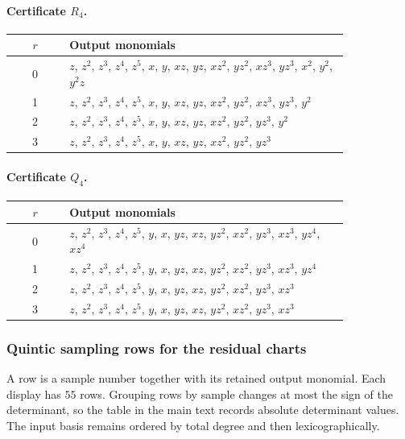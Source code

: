 \documentclass[11pt]{amsart}
\theoremstyle{definition}
\theoremstyle{remark}
\numberwithin{equation}{section}
\begin{document}
\paragraph{Certificate $R_{4}$.}\mbox{}
\begin{center}
\begin{tabular}{cp{0.83\linewidth}}
$r$ & Output monomials\\\hline
0 & \(z\), \(z^{2}\), \(z^{3}\), \(z^{4}\), \(z^{5}\), \(x\), \(y\), \(xz\), \(yz\), \(xz^{2}\), \(yz^{2}\), \(xz^{3}\), \(yz^{3}\), \(x^{2}\), \(y^{2}\), \(y^{2}z\)\\
1 & \(z\), \(z^{2}\), \(z^{3}\), \(z^{4}\), \(z^{5}\), \(x\), \(y\), \(xz\), \(yz\), \(xz^{2}\), \(yz^{2}\), \(xz^{3}\), \(yz^{3}\), \(y^{2}\)\\
2 & \(z\), \(z^{2}\), \(z^{3}\), \(z^{4}\), \(z^{5}\), \(x\), \(y\), \(xz\), \(yz\), \(xz^{2}\), \(yz^{2}\), \(yz^{3}\), \(y^{2}\)\\
3 & \(z\), \(z^{2}\), \(z^{3}\), \(z^{4}\), \(z^{5}\), \(x\), \(y\), \(xz\), \(yz\), \(xz^{2}\), \(yz^{2}\), \(yz^{3}\)\\
\end{tabular}
\end{center}

\paragraph{Certificate $Q_{4}$.}\mbox{}
\begin{center}
\begin{tabular}{cp{0.83\linewidth}}
$r$ & Output monomials\\\hline
0 & \(z\), \(z^{2}\), \(z^{3}\), \(z^{4}\), \(z^{5}\), \(y\), \(x\), \(yz\), \(xz\), \(yz^{2}\), \(xz^{2}\), \(yz^{3}\), \(xz^{3}\), \(yz^{4}\), \(xz^{4}\)\\
1 & \(z\), \(z^{2}\), \(z^{3}\), \(z^{4}\), \(z^{5}\), \(y\), \(x\), \(yz\), \(xz\), \(yz^{2}\), \(xz^{2}\), \(yz^{3}\), \(xz^{3}\), \(yz^{4}\)\\
2 & \(z\), \(z^{2}\), \(z^{3}\), \(z^{4}\), \(z^{5}\), \(y\), \(x\), \(yz\), \(xz\), \(yz^{2}\), \(xz^{2}\), \(yz^{3}\), \(xz^{3}\)\\
3 & \(z\), \(z^{2}\), \(z^{3}\), \(z^{4}\), \(z^{5}\), \(y\), \(x\), \(yz\), \(xz\), \(yz^{2}\), \(xz^{2}\), \(yz^{3}\), \(xz^{3}\)\\
\end{tabular}
\end{center}

\subsubsection{Quintic sampling rows for the residual charts}\label{supp:quintic-residual-rows}
A row is a sample number together with its retained output monomial. Each display has $55$ rows. Grouping rows by sample changes at most the sign of the determinant, so the table in the main text records absolute determinant values. The input basis remains ordered by total degree and then lexicographically.
\end{document}
